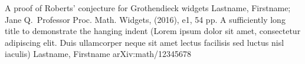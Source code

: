 

\begin{cvpublications}
  \cvpublication
    {A proof of Roberts' conjecture for Grothendieck widgets} %
    {Lastname, Firstname; Jane Q.~Professor} %
    {Proc. Math. Widgets, (2016), e1, 54 pp.} %
  \cvpublication
    {A sufficiently long title to demonstrate the hanging indent (Lorem ipsum dolor sit amet, consectetur adipiscing elit. Duis ullamcorper neque sit amet lectus facilisis sed luctus nisl iaculis)} %
    {Lastname, Firstname} %
    {arXiv:math/12345678} %
\end{cvpublications}